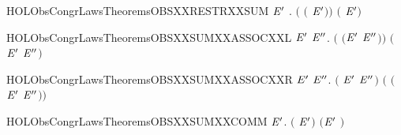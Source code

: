 \begin{SaveVerbatim}{HOLObsCongrLawsTheoremsOBSXXRESTRXXSUM}
\HOLTokenTurnstile{} \HOLSymConst{\HOLTokenForall{}} \ensuremath{\HOLBoundVar{E}\sp{\prime}} .  \ensuremath{(}  \ensuremath{(} \HOLSymConst{\ensuremath{+}} \ensuremath{\HOLBoundVar{E}\sp{\prime}}\ensuremath{)}\ensuremath{)} \ensuremath{(}   \HOLSymConst{\ensuremath{+}}   \ensuremath{\HOLBoundVar{E}\sp{\prime}}\ensuremath{)}
\end{SaveVerbatim}
\newcommand{\HOLObsCongrLawsTheoremsOBSXXRESTRXXSUM}{\UseVerbatim{HOLObsCongrLawsTheoremsOBSXXRESTRXXSUM}}
\begin{SaveVerbatim}{HOLObsCongrLawsTheoremsOBSXXSUMXXASSOCXXL}
\HOLTokenTurnstile{} \HOLSymConst{\HOLTokenForall{}} \ensuremath{\HOLBoundVar{E}\sp{\prime}} \ensuremath{\HOLBoundVar{E}\sp{\prime\prime}}.  \ensuremath{(} \HOLSymConst{\ensuremath{+}} \ensuremath{(}\ensuremath{\HOLBoundVar{E}\sp{\prime}} \HOLSymConst{\ensuremath{+}} \ensuremath{\HOLBoundVar{E}\sp{\prime\prime}}\ensuremath{)}\ensuremath{)} \ensuremath{(} \HOLSymConst{\ensuremath{+}} \ensuremath{\HOLBoundVar{E}\sp{\prime}} \HOLSymConst{\ensuremath{+}} \ensuremath{\HOLBoundVar{E}\sp{\prime\prime}}\ensuremath{)}
\end{SaveVerbatim}
\newcommand{\HOLObsCongrLawsTheoremsOBSXXSUMXXASSOCXXL}{\UseVerbatim{HOLObsCongrLawsTheoremsOBSXXSUMXXASSOCXXL}}
\begin{SaveVerbatim}{HOLObsCongrLawsTheoremsOBSXXSUMXXASSOCXXR}
\HOLTokenTurnstile{} \HOLSymConst{\HOLTokenForall{}} \ensuremath{\HOLBoundVar{E}\sp{\prime}} \ensuremath{\HOLBoundVar{E}\sp{\prime\prime}}.  \ensuremath{(} \HOLSymConst{\ensuremath{+}} \ensuremath{\HOLBoundVar{E}\sp{\prime}} \HOLSymConst{\ensuremath{+}} \ensuremath{\HOLBoundVar{E}\sp{\prime\prime}}\ensuremath{)} \ensuremath{(} \HOLSymConst{\ensuremath{+}} \ensuremath{(}\ensuremath{\HOLBoundVar{E}\sp{\prime}} \HOLSymConst{\ensuremath{+}} \ensuremath{\HOLBoundVar{E}\sp{\prime\prime}}\ensuremath{)}\ensuremath{)}
\end{SaveVerbatim}
\newcommand{\HOLObsCongrLawsTheoremsOBSXXSUMXXASSOCXXR}{\UseVerbatim{HOLObsCongrLawsTheoremsOBSXXSUMXXASSOCXXR}}
\begin{SaveVerbatim}{HOLObsCongrLawsTheoremsOBSXXSUMXXCOMM}
\HOLTokenTurnstile{} \HOLSymConst{\HOLTokenForall{}} \ensuremath{\HOLBoundVar{E}\sp{\prime}}.  \ensuremath{(} \HOLSymConst{\ensuremath{+}} \ensuremath{\HOLBoundVar{E}\sp{\prime}}\ensuremath{)} \ensuremath{(}\ensuremath{\HOLBoundVar{E}\sp{\prime}} \HOLSymConst{\ensuremath{+}} \ensuremath{)}
\end{SaveVerbatim}
